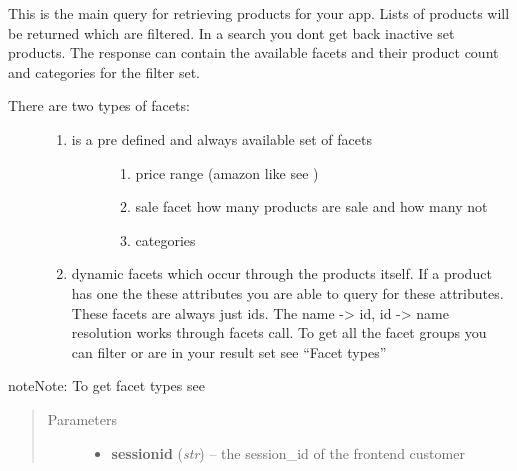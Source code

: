 \documentclass[letterpaper,10pt,english]{sphinxmanual}
\begin{document}
\begin{fulllineitems}
\begin{fulllineitems}
\end{fulllineitems}


\begin{fulllineitems}
\label{collins:collins.Collins.productsearch}
This is the main query for retrieving products for your app.
Lists of products will be returned which are filtered.
In a search you dont get back inactive set products.
The response can contain the available facets and their product count
and categories for the filter set.
\begin{description}
\item[{There are two types of facets:}] \leavevmode\begin{enumerate}
\item {} \begin{description}
\item[{is a pre defined and always available set of facets}] \leavevmode\begin{enumerate}
\item {} 
price range (amazon like see )

\item {} 
sale facet how many products are sale and how many not

\item {} 
categories

\end{enumerate}

\end{description}

\item {} 
dynamic facets which occur through the products itself. If a
product has one the these attributes you are able to query for
these attributes. These facets are always just ids.
The name -\textgreater{} id, id -\textgreater{} name resolution works through facets call.
To get all the facet groups you can filter or are in your result
set see ``Facet types''

\end{enumerate}

\end{description}

\begin{notice}{note}{Note:}
To get facet types see {\hyperref[collins:collins.Constants]{}}
\end{notice}
\begin{quote}\begin{description}
\item[{Parameters}] \leavevmode\begin{itemize}
\item {} 
\textbf{sessionid} (\emph{str}) -- the session\_id of the frontend customer


\end{itemize}
\end{description}
\end{quote}
\end{fulllineitems}
\end{fulllineitems}
\end{document}
